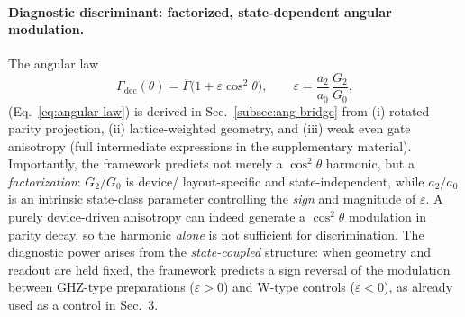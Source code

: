 \documentclass[12pt,a4paper]{article}
\numberwithin{equation}{section}
\begin{document}
\paragraph{Diagnostic discriminant: factorized, state-dependent angular modulation.}
The angular law
\begin{equation*}
\Gamma_{\mathrm{dec}}(\theta)=\overline\Gamma\big(1+\varepsilon\cos^2\theta\big),
\qquad
\varepsilon=\frac{a_2}{a_0}\,\frac{G_2}{G_0},
\end{equation*}
(Eq.~\eqref{eq:angular-law}) is derived in Sec.~\ref{subsec:ang-bridge} from (i) rotated-parity projection,
(ii) lattice-weighted geometry, and (iii) weak even gate anisotropy (full intermediate expressions in the supplementary material). Importantly, the
framework predicts not merely a $\cos^2\theta$ harmonic, but a \emph{factorization}:
$G_2/G_0$ is device/ layout-specific and state-independent, while $a_2/a_0$ is an intrinsic
state-class parameter controlling the \emph{sign} and magnitude of $\varepsilon$.
A purely device-driven anisotropy can indeed generate a $\cos^2\theta$ modulation in parity decay,
so the harmonic \emph{alone} is not sufficient for discrimination.
The diagnostic power arises from the \emph{state-coupled} structure:
when geometry and readout are held fixed, the framework predicts a sign reversal of the
modulation between GHZ-type preparations ($\varepsilon>0$) and W-type controls ($\varepsilon<0$),
as already used as a control in Sec.~3.
\end{document}
